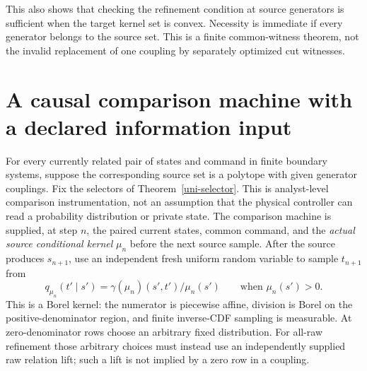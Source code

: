 \documentclass[11pt]{article}
\begin{document}
This also shows that checking the refinement condition at source generators is sufficient when the target kernel set is convex. Necessity is immediate if every generator belongs to the source set. This is a finite common-witness theorem, not the invalid replacement of one coupling by separately optimized cut witnesses.

\section{A causal comparison machine with a declared information input}
For every currently related pair of states and command in finite boundary systems, suppose the corresponding source set is a polytope with given generator couplings. Fix the selectors of Theorem~\ref{uni-selector}. This is analyst-level comparison instrumentation, not an assumption that the physical controller can read a probability distribution or private state. The comparison machine is supplied, at step $n$, the paired current states, common command, and the \emph{actual source conditional kernel} $\mu_n$ before the next source sample. After the source produces $s_{n+1}$, use an independent fresh uniform random variable to sample $t_{n+1}$ from
\[
 q_{\mu_n}(t'\mid s')=\gamma(\mu_n)(s',t')/\mu_n(s')\qquad\text{when }\mu_n(s')>0.
\]
This is a Borel kernel: the numerator is piecewise affine, division is Borel on the positive-denominator region, and finite inverse-CDF sampling is measurable. At zero-denominator rows choose an arbitrary fixed distribution. For all-raw refinement those arbitrary choices must instead use an independently supplied raw relation lift; such a lift is not implied by a zero row in a coupling.
\end{document}
